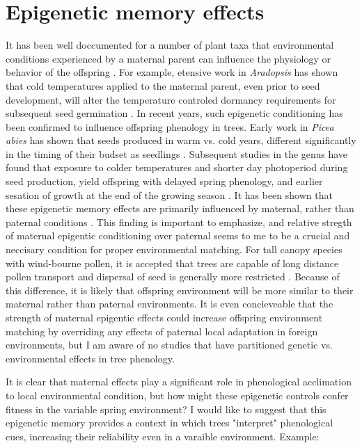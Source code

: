 \documentclass{article}\usepackage[]{graphicx}\usepackage[]{color}
\begin{document}
\section{Epigenetic memory effects}
\par It has been well doccumented for a number of plant taxa that environmental conditions experienced by a maternal parent can influence the physiology or behavior of the offspring \citep{}. For example, etensive work in \textit{Aradopsis} has shown that cold temperatures applied to the maternal parent, even prior to seed development, will alter the temperature controled dormancy requirements for subsequent seed germination \citep{Auge2017}. In recent years, such epigenetic conditioning has been confirmed to influence offspring phenology in trees. Early work in \textit{Picea abies} has shown that seeds produced in warm vs. cold years, different significantly in the timing of their budset as seedlings \citep{Kohmann1994}. Subsequent studies in the genus have found that exposure to colder temperatures and shorter day photoperiod during seed production, yield offspring with delayed spring phenology, and earlier sesation of growth at the end of the growing season \citep{Johnsen2005, Gomery2014}. It has been shown that these epigenetic memory effects are primarily influenced by maternal, rather than paternal conditions \citep{Johnsen1996}. This finding is important to emphasize, and relative stregth of maternal epigentic conditioning over paternal seems to me to be a crucial and neccisary condition for proper environmental matching. For tall canopy species with wind-bourne pollen, it is accepted that trees are capable of long distance pollen transport and dispersal of seed is generally more restricted \citep{}. Because of this difference, it is likely that offspring environment will be more similar to their maternal rather than paternal environments. It is even concieveable that the strength of maternal epigentic effects could increase offspring environment matching by overriding any effects of paternal local adaptation in foreign environments, but I am aware of no studies that have partitioned genetic vs. environmental effects in tree phenology.
\par It is clear that maternal effects play a significant role in phenological acclimation to local environmental condition, but how might these epigenetic controls confer fitness in the variable spring environment? I would like to suggest that this epigenetic memory provides a context in which trees "interpret" phenological cues, increasing their reliability even in a varaible environment. Example:
\end{document}
